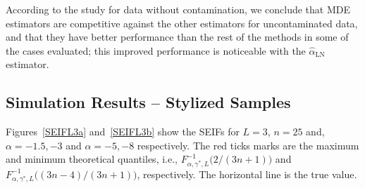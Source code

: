 \documentclass[twocolumn]{svjour3}
\begin{document}

According to the study for data without contamination, we conclude that MDE estimators are competitive against the other estimators for uncontaminated data, and that they have better performance than the rest of the methods in some of the cases evaluated; this improved performance is noticeable with the $\widehat{\alpha}_{\text{{LN}}}$ estimator.

\subsection{Simulation Results -- Stylized Samples}
\label{StylizedSamples}

Figures~\ref{SEIFL3a} and~\ref{SEIFL3b} show the SEIFs for $L=3$, $n=25$ and, $\alpha=-1.5,-3$ and $\alpha=-5,-8$ respectively. 
The red ticks marks are the maximum and minimum theoretical quantiles, i.e., $F^{-1}_{\alpha,\gamma^*,L}\big(2/(3n+1)\big)$ and $F^{-1}_{\alpha,\gamma^*,L}\big((3n-4)/(3n+1)\big)$, respectively.
The horizontal line is the true value.
\end{document}
